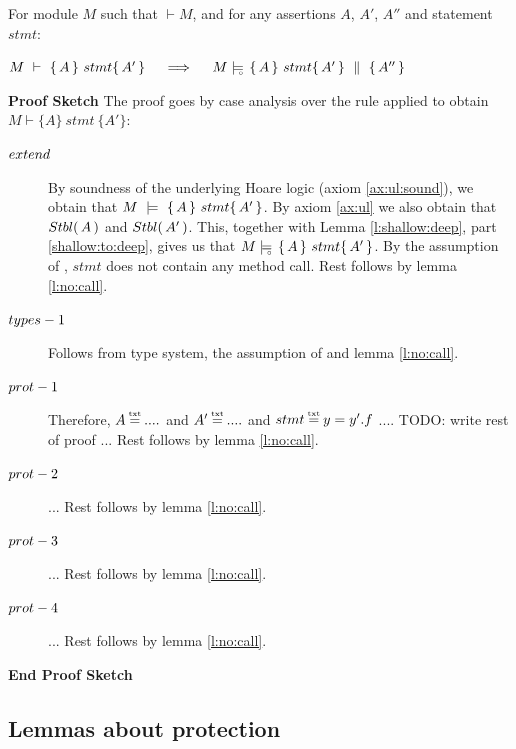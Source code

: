 \begin{Theorem}
\label{l:triples:sound}
For module  $M$ %
such that  $\vdash M$, and for any assertions $A$,  $A'$, $A''$ and statement  $stmt$:
\begin{center}
$M\ \vdash\  \triple A {stmt} {A'}  \ \ \ \  \Longrightarrow  \ \ \ \ \satisfiesD {M} {\quadruple {A} {stmt} {A'} {A''}}$
\end{center}
\end{Theorem}
 

\noindent
\vspace{.2cm}
 {\textbf{Proof Sketch}} 
The proof goes by case analysis over the rule applied to obtain $M \vdash \{ A \}\ stmt \  \{ A' \} $:

\begin{description} 

\item[${\sc{extend}}$] 
By  soundness of the underlying Hoare logic (axiom \ref{ax:ul:sound}), we obtain that  $M\ \models\  \{\, A \, \}\ stmt \{\, A' \, \}$.
By axiom \ref{ax:ul} we also obtain that ${Stbl(\, A\, )}$ and  ${Stbl(\, A'\, )}$. 
This, together with   Lemma \ref{l:shallow:deep}, part \ref{shallow:to:deep}, gives us that
$M \models\!\!\!\!_{_{\circ}}\   \{\, A \, \}\ stmt \{\, A' \, \}  $. 
By the assumption of {}, $stmt$ does not contain any method call. Rest follows by lemma \ref{l:no:call}.

\item[${\sc{types-1}}$] 

Follows from type system, the assumption of {} and lemma \ref{l:no:call}.

\item[${\sc{prot-1}}$]  
Therefore, $A \txteq ....$ and $A' \txteq ....$  and $stmt \txteq y=y'.f$ .... TODO: write rest of proof ...
Rest follows by lemma \ref{l:no:call}.
\item[${\sc{prot-2}}$] ... Rest follows by lemma \ref{l:no:call}.

\item[${\sc{prot-3}}$] ... Rest follows by lemma \ref{l:no:call}.

\item[${\sc{prot-4}}$] ... Rest follows by lemma \ref{l:no:call}.

\end{description}
\noindent
\vspace{.1cm}
{\textbf{End Proof Sketch}} 

\subsection{Lemmas about protection}

